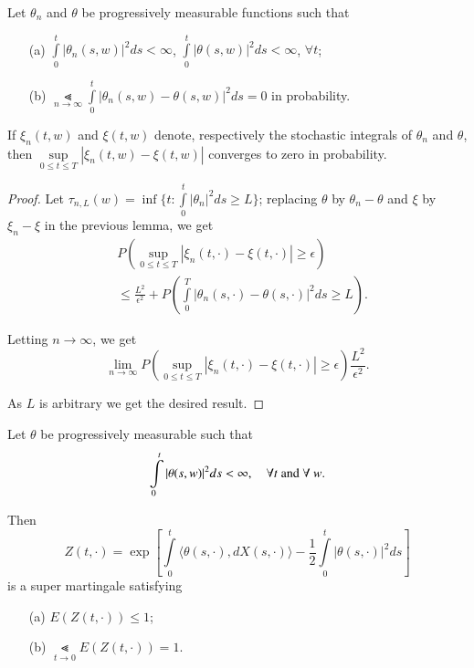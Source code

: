\begin{coro*}
Let $\theta_{n}$ and $\theta$ be progressively measurable functions
such that
\begin{itemize}
\item[\rm(a)] $\int\limits^{t}_{0}|\theta_{n}(s,w)|^{2}ds<\infty$,
  $\int\limits^{t}_{0}|\theta(s,w)|^{2}ds<\infty$, $\forall t$;

\item[\rm(b)] $\Lt\limits_{n\to
  \infty}\int\limits^{t}_{0}|\theta_{n}(s,w)-\theta(s,w)|^{2}ds=0$ in
  probability. 
\end{itemize}

If $\xi_{n}(t,w)$ and $\xi(t,w)$ denote, respectively the stochastic
integrals of $\theta_{n}$ and $\theta$, then
$\sup\limits_{0\leq t\leq T}|\xi_{n}(t,w)-\xi(t,w)|$ converges to zero
in probability.
\end{coro*}

\begin{proof}
Let $\tau_{n,L}(w)=\inf \{t:\int\limits^{t}_{0}|\theta_{n}|^{2}ds\geq
L\}$; replacing $\theta$ by $\theta_{n}-\theta$ and $\xi$ by
$\xi_{n}-\xi$ in the previous lemma, we get
\begin{align*}
& P\left(\sup\limits_{0\leq t\leq
    T}|\xi_{n}(t,\cdot)-\xi(t,\cdot)|\geq \epsilon\right)\\
&\leq
  \frac{L^{2}}{\epsilon^{2}}+P\left(\int\limits^{T}_{0}|\theta_{n}(s,\cdot)-\theta(s,\cdot)|^{2}ds\geq
  L\right). 
\end{align*}

Letting $n\to \infty$, we get
$$
\lim\limits_{n\to \infty}P\left(\sup\limits_{0\leq t\leq
  T}|\xi_{n}(t,\cdot)-\xi(t,\cdot)|\geq
\epsilon\right)\frac{L^{2}}{\epsilon^{2}}.
$$

As $L$ is arbitrary we get the desired result.
\end{proof}

\begin{prop*}
Let $\theta$ be progressively measurable such that
$$
\int\limits^{t}_{0}|\theta(s,w)|^{2}ds<\infty,\quad \forall t\text{~ and~
}\forall\ w. 
$$

Then\pageoriginale
\begin{equation*}
Z(t,\cdot)=\exp\left[\int\limits^{t}_{0}\langle
  \theta(s,\cdot),dX(s,\cdot)\rangle
  -\frac{1}{2}\int\limits^{t}_{0}|\theta(s,\cdot)|^{2}ds\right]\tag{*} 
\end{equation*}
is a super martingale satisfying
\begin{itemize}
\item[\rm(a)] $E(Z(t,\cdot))\leq 1$;

\item[\rm(b)] $\Lt\limits_{t\to 0}E(Z(t,\cdot))=1$.
\end{itemize}
\end{prop*}

